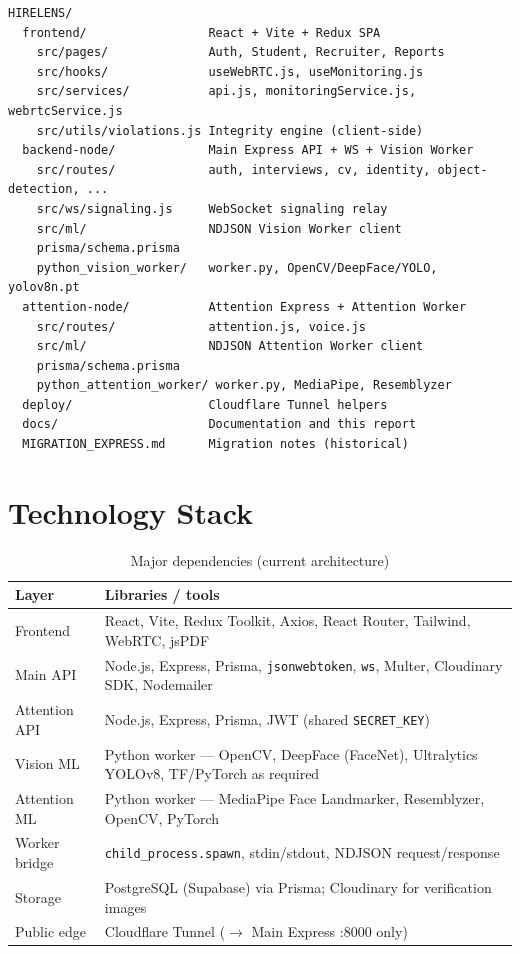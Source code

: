 \documentclass[11pt,a4paper]{report}
\begin{document}
\begin{verbatim}
HIRELENS/
  frontend/                 React + Vite + Redux SPA
    src/pages/              Auth, Student, Recruiter, Reports
    src/hooks/              useWebRTC.js, useMonitoring.js
    src/services/           api.js, monitoringService.js, webrtcService.js
    src/utils/violations.js Integrity engine (client-side)
  backend-node/             Main Express API + WS + Vision Worker
    src/routes/             auth, interviews, cv, identity, object-detection, ...
    src/ws/signaling.js     WebSocket signaling relay
    src/ml/                 NDJSON Vision Worker client
    prisma/schema.prisma
    python_vision_worker/   worker.py, OpenCV/DeepFace/YOLO, yolov8n.pt
  attention-node/           Attention Express + Attention Worker
    src/routes/             attention.js, voice.js
    src/ml/                 NDJSON Attention Worker client
    prisma/schema.prisma
    python_attention_worker/ worker.py, MediaPipe, Resemblyzer
  deploy/                   Cloudflare Tunnel helpers
  docs/                     Documentation and this report
  MIGRATION_EXPRESS.md      Migration notes (historical)
\end{verbatim}

\chapter{Technology Stack}

\begin{table}[H]
\centering
\caption{Major dependencies (current architecture)}
\small
\begin{tabularx}{\textwidth}{@{}lX@{}}
\toprule
\textbf{Layer} & \textbf{Libraries / tools} \\
\midrule
Frontend & React, Vite, Redux Toolkit, Axios, React Router, Tailwind, WebRTC, jsPDF \\
Main API & Node.js, Express, Prisma, \texttt{jsonwebtoken}, \texttt{ws}, Multer, Cloudinary SDK, Nodemailer \\
Attention API & Node.js, Express, Prisma, JWT (shared \texttt{SECRET\_KEY}) \\
Vision ML & Python worker --- OpenCV, DeepFace (FaceNet), Ultralytics YOLOv8, TF/PyTorch as required \\
Attention ML & Python worker --- MediaPipe Face Landmarker, Resemblyzer, OpenCV, PyTorch \\
Worker bridge & \texttt{child\_process.spawn}, stdin/stdout, NDJSON request/response \\
Storage & PostgreSQL (Supabase) via Prisma; Cloudinary for verification images \\
Public edge & Cloudflare Tunnel ($\rightarrow$ Main Express :8000 only) \\
\bottomrule
\end{tabularx}
\end{table}
\end{document}
